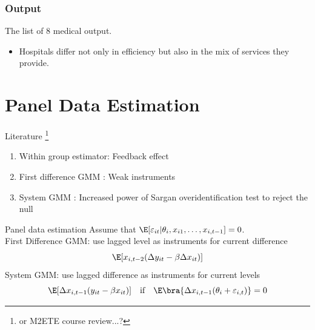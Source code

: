 \documentclass[10pt, aspectratio=169]{beamer}
\begin{document}
\begin{frame}[label=output]
  \frametitle{Output}
  The list of 8 medical output.
  \begin{table}
    \begin{adjustbox}{width=0.9\textwidth,center}
      \centering
      
    \end{adjustbox}
  \end{table}
  \begin{itemize}\itemsep = 8pt
    \item Hospitals differ not only in efficiency but also in the mix of services they
          provide.

  \end{itemize}

\end{frame}

\section{Panel Data Estimation}
\begin{frame}{Literature \footnote{or M2ETE course review...?}}
  \begin{enumerate}
    \item Within group estimator: \alert{Feedback effect}
    \item First difference GMM \citep{anderson1982formulation,arellano1991some}:
          \alert{Weak instruments}
    \item System GMM \citep{arellano1995another,blundell1998initial}: \alert{Increased
            power of Sargan overidentification test to reject the null}
          \citet{blundell2000gmm}
  \end{enumerate}

\end{frame}
\begin{frame}{Panel data estimation}
  Assume that $\E[\varepsilon_{it}|\theta_i,x_{i1},\ldots,x_{i,t-1}]=0$.\\
  \alert{First Difference GMM}: use lagged level as instruments for current difference
  \begin{equation*}
    \E[x_{i,t-2}(\Delta y_{it}-\beta \Delta x_{it})]
  \end{equation*}
  \alert{System GMM}: use lagged difference as instruments for current levels
  \begin{equation*}
    \E[\Delta x_{i,t-1}(y_{it}-\beta x_{it})] \quad \text{if}\quad \E\bra{\Delta x_{i,t-1}(\theta_i+\varepsilon_{i,t})}=0
  \end{equation*}
\end{frame}
\end{document}
